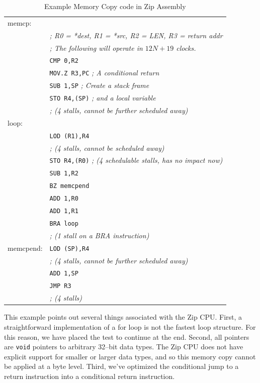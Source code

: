 \documentclass{gqtekspec}
\begin{document}
\begin{table}\begin{center}
\begin{tabular}{ll}
memcp: \\
&        {\em ; R0 = *dest, R1 = *src, R2 = LEN, R3 = return addr} \\
&        {\em ; The following will operate in $12N+19$ clocks.} \\
&        {\tt CMP 0,R2} \\ %
&        {\tt MOV.Z R3,PC} {\em ; A conditional return }\\
&        {\tt SUB 1,SP} {\em ; Create a stack frame}\\
&        {\tt STO R4,(SP)} {\em ; and a local variable}\\
&        {\em ; (4 stalls, cannot be further scheduled away)} \\
loop: \\ %
&        {\tt LOD (R1),R4} \\
&        {\em ; (4 stalls, cannot be scheduled away)} \\
&        {\tt STO R4,(R0)} {\em ; (4 schedulable stalls, has no impact now)} \\
&        {\tt SUB 1,R2} \\
&        {\tt BZ memcpend} \\
&        {\tt ADD 1,R0} \\
&        {\tt ADD 1,R1} \\
&        {\tt BRA loop} \\
&        {\em ; (1 stall on a BRA instruction)} \\
memcpend: %
&        {\tt LOD (SP),R4} \\
&        {\em ; (4 stalls, cannot be further scheduled away)} \\
&        {\tt ADD 1,SP} \\
&        {\tt JMP R3} \\
&        {\em ; (4 stalls)} \\
\end{tabular}
\caption{Example Memory Copy code in Zip Assembly}\label{tbl:memcp-asm}
\end{center}\end{table}
This example points out several things associated with the Zip CPU.  First,
a straightforward implementation of a for loop is not the fastest loop
structure.  For this reason, we have placed the test to continue at the
end.  Second, all pointers are {\tt void} pointers to arbitrary 32--bit
data types.  The Zip CPU does not have explicit support for smaller or larger
data types, and so this memory copy cannot be applied at a byte level.
Third, we've optimized the conditional jump to a return instruction into a
conditional return instruction.
\end{document}

